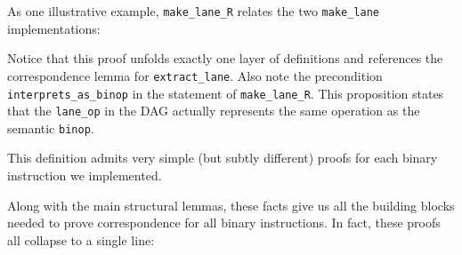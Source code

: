 As one illustrative example, \texttt{make_lane_R} relates the two \texttt{make_lane} implementations:


Notice that this proof unfolds exactly one layer of definitions and references the correspondence lemma for \texttt{extract_lane}. 
Also note the precondition \texttt{interprets_as_binop} in the statement of \texttt{make_lane_R}. This proposition states that the \texttt{lane_op} in the DAG actually represents the same operation as the semantic \texttt{binop}.


This definition admits very simple (but subtly different) proofs for each binary instruction we implemented.



Along with the main structural lemmas, these facts give us all the building blocks needed to prove correspondence for all binary instructions. In fact, these proofs all collapse to a single line:

